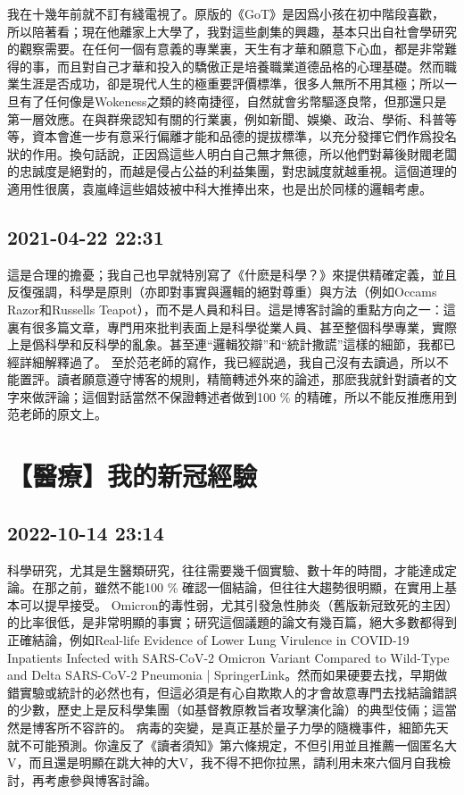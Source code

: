 \documentclass[twocolumn]{ctexart}
\begin{document}
我在十幾年前就不訂有綫電視了。原版的《GoT》是因爲小孩在初中階段喜歡，所以陪著看；現在他離家上大學了，我對這些劇集的興趣，基本只出自社會學研究的觀察需要。在任何一個有意義的專業裏，天生有才華和願意下心血，都是非常難得的事，而且對自己才華和投入的驕傲正是培養職業道德品格的心理基礎。然而職業生涯是否成功，卻是現代人生的極重要評價標準，很多人無所不用其極；所以一旦有了任何像是Wokeness之類的終南捷徑，自然就會劣幣驅逐良幣，但那還只是第一層效應。在與群衆認知有關的行業裏，例如新聞、娛樂、政治、學術、科普等等，資本會進一步有意采行偏離才能和品德的提拔標準，以充分發揮它們作爲投名狀的作用。換句話說，正因爲這些人明白自己無才無德，所以他們對幕後財閥老闆的忠誠度是絕對的，而越是侵占公益的利益集團，對忠誠度就越重視。這個道理的適用性很廣，袁嵐峰這些娼妓被中科大推捧出來，也是出於同樣的邏輯考慮。
\subsection*{2021-04-22 22:31}

這是合理的擔憂；我自己也早就特別寫了《什麽是科學？》來提供精確定義，並且反復强調，科學是原則（亦即對事實與邏輯的絕對尊重）與方法（例如Occams Razor和Russells Teapot），而不是人員和科目。這是博客討論的重點方向之一：這裏有很多篇文章，專門用來批判表面上是科學從業人員、甚至整個科學專業，實際上是僞科學和反科學的亂象。甚至連“邏輯狡辯”和“統計撒謊”這樣的細節，我都已經詳細解釋過了。
至於范老師的寫作，我已經説過，我自己沒有去讀過，所以不能置評。讀者願意遵守博客的規則，精簡轉述外來的論述，那麽我就針對讀者的文字來做評論；這個對話當然不保證轉述者做到100 \% 的精確，所以不能反推應用到范老師的原文上。
\section*{【醫療】我的新冠經驗}
\subsection*{2022-10-14 23:14}

科學研究，尤其是生醫類研究，往往需要幾千個實驗、數十年的時間，才能達成定論。在那之前，雖然不能100 \% 確認一個結論，但往往大趨勢很明顯，在實用上基本可以提早接受。
Omicron的毒性弱，尤其引發急性肺炎（舊版新冠致死的主因）的比率很低，是非常明顯的事實；研究這個議題的論文有幾百篇，絕大多數都得到正確結論，例如Real-life Evidence of Lower Lung Virulence in COVID-19 Inpatients Infected with SARS-CoV-2 Omicron Variant Compared to Wild-Type and Delta SARS-CoV-2 Pneumonia | SpringerLink。然而如果硬要去找，早期做錯實驗或統計的必然也有，但這必須是有心自欺欺人的才會故意專門去找結論錯誤的少數，歷史上是反科學集團（如基督教原教旨者攻擊演化論）的典型伎倆；這當然是博客所不容許的。
病毒的突變，是真正基於量子力學的隨機事件，細節先天就不可能預測。你違反了《讀者須知》第六條規定，不但引用並且推薦一個匿名大V，而且還是明顯在跳大神的大V，我不得不把你拉黑，請利用未來六個月自我檢討，再考慮參與博客討論。
\end{document}
